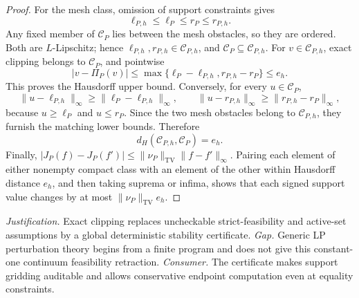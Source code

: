 \documentclass{article}
\begin{document}
\begin{proof}
For the mesh class, omission of support constraints gives
\[
 \ell_{P,h}\leq\ell_P\leq r_P\leq r_{P,h}.
\]
Any fixed member of \(\mathcal C_P\) lies between the mesh obstacles, so they are ordered.  Both are \(L\)-Lipschitz; hence \(\ell_{P,h},r_{P,h}\in\mathcal C_{P,h}\), and \(\mathcal C_P\subseteq\mathcal C_{P,h}\).  For \(v\in\mathcal C_{P,h}\), exact clipping belongs to \(\mathcal C_P\), and pointwise
\[
 |v-\Pi_P(v)|
 \leq\max\{\ell_P-\ell_{P,h},r_{P,h}-r_P\}
 \leq e_h.
\]
This proves the Hausdorff upper bound.  Conversely, for every \(u\in\mathcal C_P\),
\[
 \|u-\ell_{P,h}\|_\infty
 \geq\|\ell_P-\ell_{P,h}\|_\infty,
 \qquad
 \|u-r_{P,h}\|_\infty
 \geq\|r_{P,h}-r_P\|_\infty,
\]
because \(u\geq\ell_P\) and \(u\leq r_P\).  Since the two mesh obstacles belong to \(\mathcal C_{P,h}\), they furnish the matching lower bounds.  Therefore
\[
 d_H(\mathcal C_{P,h},\mathcal C_P)=e_h.
\]
Finally, \(|J_P(f)-J_P(f')|\leq\|\nu_P\|_{\mathrm{TV}}\|f-f'\|_\infty\).  Pairing each element of either nonempty compact class with an element of the other within Hausdorff distance \(e_h\), and then taking suprema or infima, shows that each signed support value changes by at most \(\|\nu_P\|_{\mathrm{TV}}e_h\).
\end{proof}
\par\smallskip\noindent \textit{Justification.} Exact clipping replaces uncheckable strict-feasibility and active-set assumptions by a global deterministic stability certificate. \textit{Gap.} Generic LP perturbation theory begins from a finite program and does not give this constant-one continuum feasibility retraction. \textit{Consumer.} The certificate makes support gridding auditable and allows conservative endpoint computation even at equality constraints.
\end{document}

